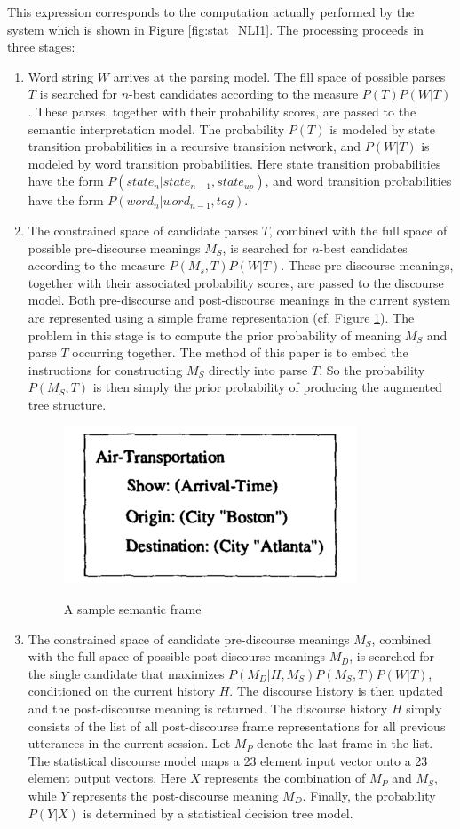 \documentclass[paper=a4, fontsize=18pt]{article} %
\numberwithin{equation}{section} %
\numberwithin{figure}{section} %
\numberwithin{table}{section} %
\begin{document}
This expression corresponds to the computation actually performed by the system which is shown in Figure \ref{fig:stat_NLI1}. The processing proceeds in three stages:
\begin{enumerate}
\item Word string $W$ arrives at the parsing model. The fill space of possible parses $T$ is searched for $n$-best candidates according to the measure $P(T)P(W|T)$. These parses, together with their probability scores, are passed to the semantic interpretation model. The probability $P(T)$ is modeled by state transition probabilities in a recursive transition network, and $P(W|T)$ is modeled by word transition probabilities. Here state transition probabilities have the form $P(state_n | state_{n-1}, state_{up})$, and word transition probabilities have the form $P(word_n | word_{n-1}, tag)$.
\item The constrained space of candidate parses $T$, combined with the full space of possible pre-discourse meanings $M_S$, is searched for $n$-best candidates according to the measure $P(M_s, T)P(W|T)$. These pre-discourse meanings, together with their associated probability scores, are passed to the discourse model. Both pre-discourse and post-discourse meanings in the current system are represented using a simple frame representation (cf. Figure \ref{fig:stat_NLI2}). The problem in this stage is to compute the prior probability of meaning $M_S$ and parse $T$ occurring together. The method of this paper is to embed the instructions for constructing $M_S$ directly into parse $T$. So the probability $P(M_S, T)$ is then simply the prior probability of producing the augmented tree structure.
    \begin{figure}[h]
      \centering
      \includegraphics[width=.4\linewidth]{stat_NLI2.png}\\
      \caption{A sample semantic frame}\label{fig:stat_NLI2}
    \end{figure}
\item The constrained space of candidate pre-discourse meanings $M_S$, combined with the full space of possible post-discourse meanings $M_D$, is searched for the single candidate that maximizes $P(M_D | H, M_S)P(M_S, T)P(W|T)$, conditioned on the current history $H$. The discourse history is then updated and the post-discourse meaning is returned. The discourse history $H$ simply consists of the list of all post-discourse frame representations for all previous utterances in the current session. Let $M_P$ denote the last frame in the list. The statistical discourse model maps a 23 element input vector onto a 23 element output vectors. Here $X$ represents the combination of $M_P$ and $M_S$, while $Y$ represents the post-discourse meaning $M_D$. Finally, the probability $P(Y | X)$ is determined by a statistical decision tree model.
\end{enumerate}
\end{document}
